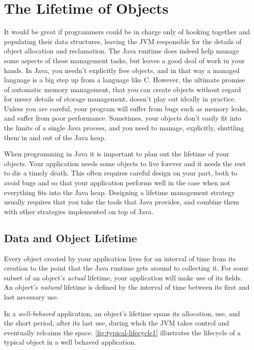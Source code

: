 \chapter{The Lifetime of Objects}

It would be great if programmers could be in charge only of hooking together and
populating their data structures, leaving the JVM responsible for the details of
object allocation and reclamation. The Java runtime does indeed help manage some
aspects of these management tasks, but leaves a good deal of work in your hands.
In Java, you needn't explicitly free objects, and in that way a managed language
is a big step up from a language like C. However, the ultimate promise of
automatic memory management, that you can create objects without regard for messy
details of storage management, doesn't play out ideally in practice. Unless you
are careful, your program will suffer from bugs such as memory leaks, and suffer
from poor performance. Sometimes, your objects don't easily fit into the limits
of a single Java process, and you need to manage, explicitly, shuttling them in
and out of the Java heap.

When programming in Java it is important to plan out the lifetime of your
objects. Your application needs some objects to live forever and it needs the
rest to die a timely death. This often requires careful design on your part, both
to avoid bugs and so that your application performs well in the case when not
everything fits into the Java heap. Designing a lifetime management strategy
usually requires that you take the tools that Java provides, and combine them
with other strategies implemented on top of Java.

\section{Data and Object Lifetime}
Every object created by your application lives for an interval of time from its
creation to the point that the Java runtime gets around to collecting it. For
some subset of an object's {\em actual} lifetime, your application will make use
of its fields. An object's {\em natural} lifetime is defined by the interval of
time between its first and last necessary use. %

In a \emph{well-behaved} application, 
an object's lifetime spans its allocation, use, and the short period, after its
last use, during whch the JVM takes control and eventually relcaims the
space.
\autoref{fig:typical-lifecycle1} illustrates the lifecycle of a typical object
in a well behaved application.

